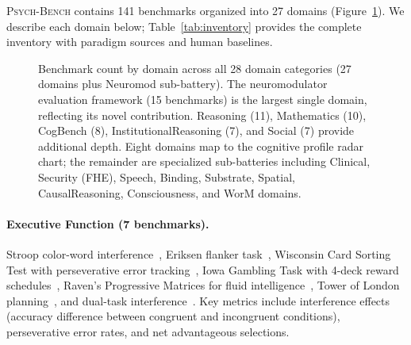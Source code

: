 \documentclass[11pt,letterpaper]{article}
\newcommand{\psychbench}{\textsc{Psych-Bench}}
\begin{document}
\psychbench{} contains 141 benchmarks organized into 27 domains (Figure~\ref{fig:domain_matrix}). We describe each domain below; Table~\ref{tab:inventory} provides the complete inventory with paradigm sources and human baselines.

\begin{figure}[t]
\centering
{}
\caption{Benchmark count by domain across all 28 domain categories (27 domains plus Neuromod sub-battery). The neuromodulator evaluation framework (15 benchmarks) is the largest single domain, reflecting its novel contribution. Reasoning (11), Mathematics (10), CogBench (8), InstitutionalReasoning (7), and Social (7) provide additional depth. Eight domains map to the cognitive profile radar chart; the remainder are specialized sub-batteries including Clinical, Security (FHE), Speech, Binding, Substrate, Spatial, CausalReasoning, Consciousness, and WorM domains.}
\label{fig:domain_matrix}
\end{figure}

\paragraph{Executive Function (7 benchmarks).} Stroop color-word interference~\citep{stroop1935interference,macleod1991half}, Eriksen flanker task~\citep{eriksen1974effects}, Wisconsin Card Sorting Test with perseverative error tracking~\citep{berg1948simple}, Iowa Gambling Task with 4-deck reward schedules~\citep{bechara1994insensitivity}, Raven's Progressive Matrices for fluid intelligence~\citep{raven1938progressive}, Tower of London planning~\citep{shallice1982specific}, and dual-task interference~\citep{pashler1994dual}. Key metrics include interference effects (accuracy difference between congruent and incongruent conditions), perseverative error rates, and net advantageous selections.
\end{document}
